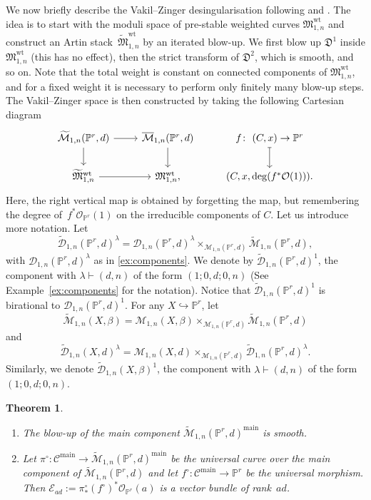 \documentclass[pdftex]{sigma}
\numberwithin{equation}{section}
\newtheorem{Theorem}{Theorem}[section]
\newcommand{\PP}{\mathbb P}
\newcommand{\MM}[4]{\overline{\mathcal M}_{#1,#2}(#3,#4)}
\theoremstyle{plain}
\theoremstyle{definition}
\theoremstyle{remark}
\begin{document}
We now briefly describe the Vakil--Zinger desingularisation following \cite{VZ} and \cite{HL}. The idea is to start with the moduli space of pre-stable weighted curves $\mathfrak M_{1,n}^\text{wt}$ and construct an Artin stack~$\widetilde{\mathfrak M}_{1,n}^\text{wt}$ by an iterated blow-up. We first blow up $\mathfrak D^1$ inside $\mathfrak M_{1,n}^\text{wt}$ (this has no effect), then the strict transform of $\mathfrak D^2$, which is smooth, and so on. Note that the total weight is constant on connected components of $\mathfrak M_{1,n}^\text{wt}$, and for a fixed weight it is necessary to perform only finitely many blow-up steps. The Vakil--Zinger space is then constructed by taking the following Cartesian diagram
\[
 \begin{tikzcd}
 \widetilde{\mathcal M}_{1,n}(\mathbb P^r,d) \ar[r]\ar[d] & \MM{1}{n}{\mathbb P^r}{d} \ar[d] & f\colon \ (C,x)\to\mathbb P^r \ar[d,mapsto] \\
 \widetilde{\mathfrak M}_{1,n}^\text{wt}\ar[r] & \mathfrak M_{1,n}^\text{wt}, & (C,x,\deg(f^*\mathcal O(1))).
 \end{tikzcd}
\]
Here, the right vertical map is obtained by forgetting the map, but remembering the degree of~$f^*\mathcal O_{\mathbb P^r}(1)$ on the irreducible components of $C$.
Let us introduce more notation. Let
\[\widetilde{\mathcal D}_{1,n}(\mathbb P^r,d)^{\lambda}= \mathcal D_{1,n}(\mathbb P^r,d)^{\lambda}\times _{ \mathcal M_{1,n}(\mathbb P^r,d)} \widetilde{\mathcal M}_{1,n}(\mathbb P^r,d),
\]
with $\mathcal D_{1,n}(\mathbb P^r,d)^{\lambda}$ as in \ref{ex:components}. We denote by $ \widetilde{\mathcal D}_{1,n}(\mathbb P^r,d)^1$, the component with $\lambda\vdash(d,n)$ of the form $(1; 0,d; 0,n)$ (See Example~\ref{ex:components} for the notation). Notice that $ \widetilde{\mathcal D}_{1,n}(\mathbb P^r,d)^1$ is birational to $ \mathcal D_{1,n}(\mathbb P^r,d)^1$. For any $X\hookrightarrow \PP^r$, let
\[ \widetilde{\mathcal M}_{1,n}(X,\beta)= \mathcal M_{1,n}(X, \beta)\times_{\mathcal M_{1,n}(\PP^r, d)} \widetilde{\mathcal M}_{1,n}(\mathbb P^r,d)\] and
\[\widetilde{\mathcal D}_{1,n}(X,d)^{\lambda}= \mathcal M_{1,n}(X,d)\times _{ \mathcal M_{1,n}(\mathbb P^r,d)} \widetilde{\mathcal D}_{1,n}(\mathbb P^r,d)^{\lambda}.
\] Similarly, we denote $\widetilde{\mathcal D}_{1,n}(X,\beta)^1$, the component with $\lambda\vdash(d,n)$ of the form $(1; 0,d; 0,n)$.
\begin{Theorem}\quad\begin{enumerate}\itemsep=0pt
\item[$(i)$] The blow-up of the main component $\widetilde{\mathcal {M}}_{1,n}(\mathbb P^r,d)^{\mathrm{main}}$ is smooth.
\item[$(ii)$] Let $\pi^{\circ}\colon \mathcal{C}^{\mathrm{main}}\to\widetilde{\mathcal {M}}_{1,n}(\mathbb P^r,d)^{\mathrm{main}}$ be the universal curve over the main component of $\widetilde{\mathcal {M}}_{1,n}(\mathbb P^r,d)$ and let $f^{\circ}\colon \mathcal{C}^{\mathrm{main}}\to \mathbb P^r$ be the universal morphism. Then $\mathcal{E}_{ad}:=\pi^\circ_* (f^\circ)^*\mathcal O_{\mathbb P^r}(a)$ is a vector bundle of rank~$ad$.
\end{enumerate}
\end{Theorem}
\end{document}
